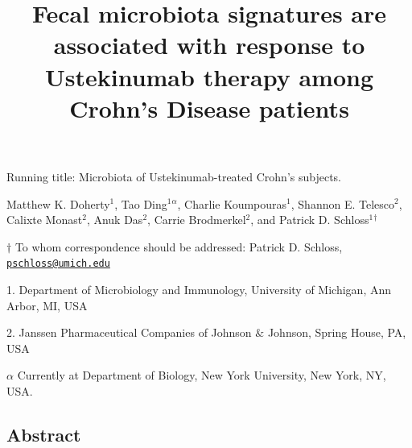 \documentclass[12pt,]{article}
\title{Fecal microbiota signatures are associated with response to Ustekinumab
therapy among Crohn's Disease patients}
\author{}
\date{}
\begin{document}
\maketitle

\vspace{35mm}

Running title: Microbiota of Ustekinumab-treated Crohn's subjects.

\vspace{35mm} Matthew K. Doherty\({^1}\), Tao Ding\({^1}\)\({^\alpha}\),
Charlie Koumpouras\({^1}\), Shannon E. Telesco\({^2}\), Calixte
Monast\({^2}\), Anuk Das\({^2}\), Carrie Brodmerkel\({^2}\), and Patrick
D. Schloss\({^1}\)\({^\dagger}\)

\(\dagger\) To whom correspondence should be addressed: Patrick D.
Schloss,
\href{mailto:pschloss@umich.edu}{\nolinkurl{pschloss@umich.edu}}

1. Department of Microbiology and Immunology, University of Michigan,
Ann Arbor, MI, USA

2. Janssen Pharmaceutical Companies of Johnson \({\&}\) Johnson, Spring
House, PA, USA

\({\alpha}\) Currently at Department of Biology, New York University,
New York, NY, USA.

\newpage

\subsection{Abstract}\label{abstract}
\end{document}
